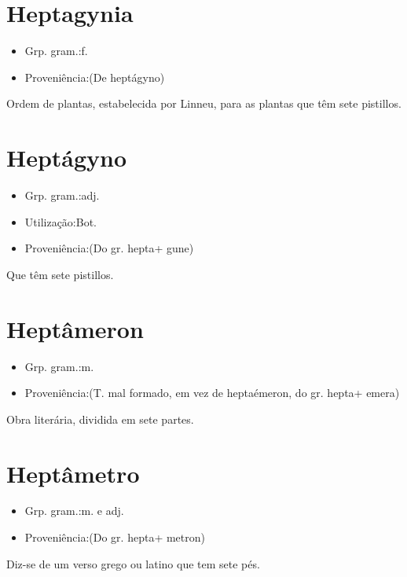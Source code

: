 \documentclass{article}
\begin{document}
\section{Heptagynia}
\begin{itemize}
\item {Grp. gram.:f.}
\end{itemize}
\begin{itemize}
\item {Proveniência:(De \textunderscore heptágyno\textunderscore )}
\end{itemize}
Ordem de plantas, estabelecida por Linneu, para as plantas que têm sete pistillos.
\section{Heptágyno}
\begin{itemize}
\item {Grp. gram.:adj.}
\end{itemize}
\begin{itemize}
\item {Utilização:Bot.}
\end{itemize}
\begin{itemize}
\item {Proveniência:(Do gr. \textunderscore hepta\textunderscore  + \textunderscore gune\textunderscore )}
\end{itemize}
Que têm sete pistillos.
\section{Heptâmeron}
\begin{itemize}
\item {Grp. gram.:m.}
\end{itemize}
\begin{itemize}
\item {Proveniência:(T. mal formado, em vez de \textunderscore heptaémeron\textunderscore , do gr. \textunderscore hepta\textunderscore  + \textunderscore emera\textunderscore )}
\end{itemize}
Obra literária, dividida em sete partes.
\section{Heptâmetro}
\begin{itemize}
\item {Grp. gram.:m.  e  adj.}
\end{itemize}
\begin{itemize}
\item {Proveniência:(Do gr. \textunderscore hepta\textunderscore  + \textunderscore metron\textunderscore )}
\end{itemize}
Diz-se de um verso grego ou latino que tem sete pés.
\end{document}
